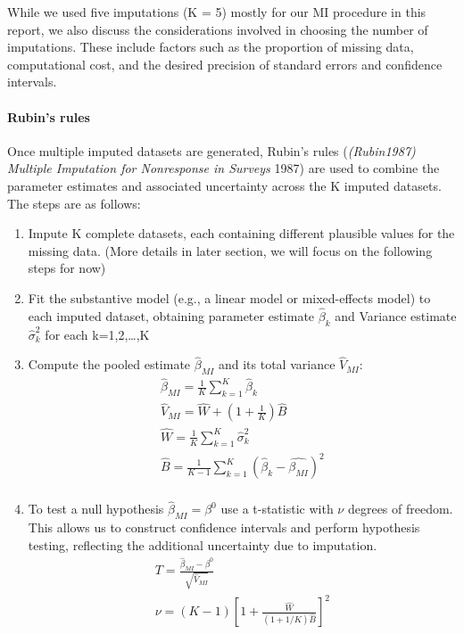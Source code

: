 \documentclass{article}
\begin{document}
While we used five imputations (K = 5) mostly for our MI procedure in
this report, we also discuss the considerations involved in choosing the
number of imputations. These include factors such as the proportion of
missing data, computational cost, and the desired precision of standard
errors and confidence intervals.

\paragraph{Rubin's rules}\label{rubins-rules}

Once multiple imputed datasets are generated, Rubin's rules
(\emph{({Rubin1987}) {Multiple} {Imputation} for {Nonresponse} in
{Surveys}} 1987) are used to combine the parameter estimates and
associated uncertainty across the K imputed datasets. The steps are as
follows:

\begin{enumerate}
\def\labelenumi{\arabic{enumi}.}
\item
  Impute K complete datasets, each containing different plausible values
  for the missing data. (More details in later section, we will focus on
  the following steps for now)
\item
  Fit the substantive model (e.g., a linear model or mixed-effects
  model) to each imputed dataset, obtaining parameter estimate
  \(\hat{\beta}_{k}\) and Variance estimate \(\hat{\sigma}_{k}^{2}\) for
  each k=1,2,\ldots,K
\item
  Compute the pooled estimate \(\hat{\beta}_{MI}\) and its total
  variance \(\hat{V}_{MI}\): \begin{align*}
    \hat{\beta}_{MI} = \frac{1}{K} \sum_{k=1}^{K}{\hat{\beta}_{k}} \\
    \hat{V}_{MI} = \hat{W} + (1 + \frac{1}{K}) \hat{B} \\
    \hat{W} = \frac{1}{K} \sum^{K}_{k=1}{\hat{\sigma}^{2}_{k}} \\
    \hat{B} = \frac{1}{K-1} \sum^{K}_{k=1}({\hat{\beta}_{k}} - \hat{\beta_{MI}})^{2} \\
    \end{align*}
\item
  To test a null hypothesis \(\hat{\beta}_{MI} = \beta^{0}\) use a
  t-statistic with \(\nu\) degrees of freedom. This allows us to
  construct confidence intervals and perform hypothesis testing,
  reflecting the additional uncertainty due to imputation.
  \begin{align*}
    T = \frac{\hat{\beta}_{MI} - \beta^{0}}  {\sqrt{\hat{V}_{MI}}} \\
    \nu = (K-1)[1 + \frac{\hat{W}}{(1 + 1/K) \hat{B}}]^{2}
    \end{align*}
\end{enumerate}
\end{document}
